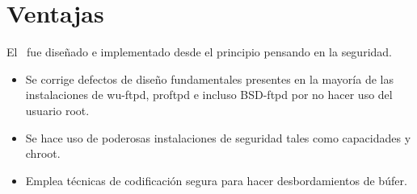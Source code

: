 \section{Ventajas}
  El \vsftpd\ fue dise\~nado e implementado desde el principio pensando en la seguridad.\\
  
  \begin{itemize}
	\item Se corrige defectos de dise\~ no fundamentales presentes en la mayor\'ia de las instalaciones de wu-ftpd, proftpd e incluso BSD-ftpd por no hacer uso del usuario root.
	\item Se hace uso de poderosas instalaciones de seguridad tales como capacidades y chroot.
	\item Emplea técnicas de codificación segura para hacer desbordamientos de búfer.
  \end{itemize}
